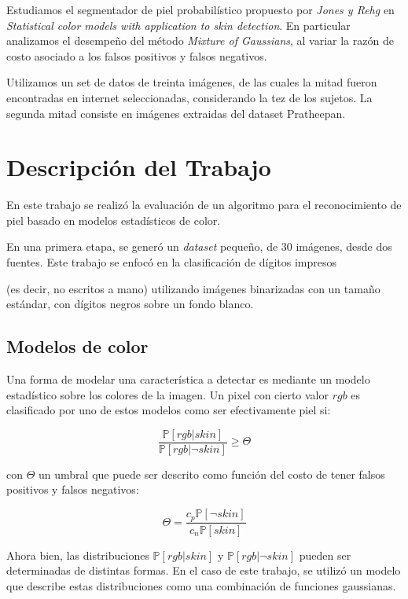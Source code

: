 \documentclass[12pt]{article}
\begin{document}
Estudiamos el segmentador de piel probabilístico propuesto por \emph{Jones y Rehg} en \emph{Statistical color models with application to skin detection}. En particular analizamos el desempeño del método \emph{Mixture of Gaussians}, al variar la razón de costo asociado a los falsos positivos y falsos negativos.

Utilizamos un set de datos de treinta imágenes, de las cuales la mitad fueron encontradas en internet seleccionadas, considerando la tez de los sujetos. La segunda mitad consiste en imágenes extraidas del dataset Pratheepan.



\section{Descripción del Trabajo}

En este trabajo se realizó la evaluación de un algoritmo para el reconocimiento
de piel basado en modelos estadísticos de color. 

En una primera etapa, se generó un \emph{dataset}
pequeño, de 30 imágenes, desde dos fuentes. 
Este trabajo se enfocó en la clasificación de dígitos impresos

(es decir, no
escritos a mano) utilizando imágenes binarizadas con un tamaño estándar, con
dígitos negros sobre un fondo blanco.

\subsection{Modelos de color}

Una forma de modelar una característica a detectar es mediante un modelo
estadístico sobre los colores de la imagen. Un pixel con cierto valor $rgb$ es
clasificado por uno de estos modelos como ser efectivamente piel si:

\begin{equation}
    \frac{ \mathbb{P} [ rgb|skin ] }{ \mathbb{P} [ rgb | \neg skin ] } \geq
    \Theta
\end{equation}

con $\Theta$ un umbral que puede ser descrito como función del costo de tener
falsos positivos y falsos negativos:

\begin{equation}
    \Theta = \frac{c_p \mathbb{P} [\neg skin]}{c_n \mathbb{P}[skin]}
\end{equation}

Ahora bien, las distribuciones $\mathbb{P} [ rgb|skin ]$ y $\mathbb{P} [ rgb | \neg
skin ]$ pueden ser determinadas de distintas formas. En el caso de este trabajo, se
utilizó un modelo que describe estas distribuciones como una combinación de
funciones gaussianas.
\end{document}
